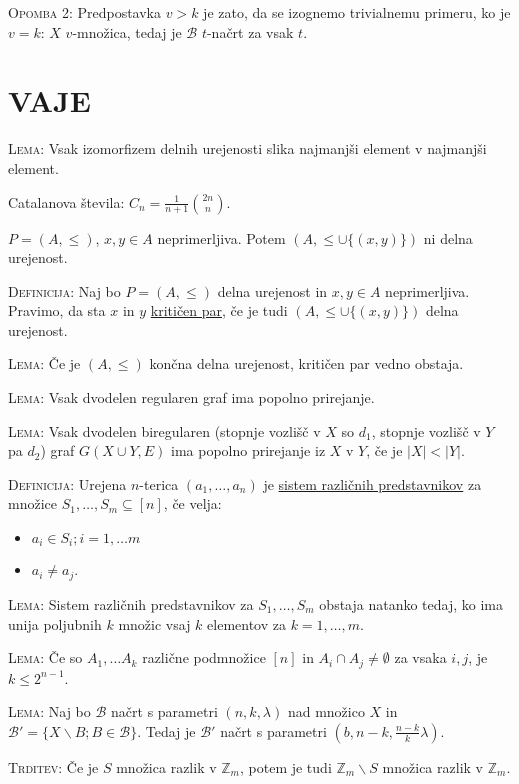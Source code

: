 \documentclass[8pt,a4paper]{amsart}
\theoremstyle{definition} %
\theoremstyle{plain} %
\newcommand{\Z}{\mathbb Z}
\begin{document}
\textsc{Opomba 2:} Predpostavka $v > k $ je zato, da se izognemo trivialnemu primeru, ko je $v = k$: $X$ $v$-množica, tedaj je $\mathcal{B}$ $t$-načrt za vsak $t$.

\section{VAJE}

\textsc{Lema:} Vsak izomorfizem delnih urejenosti slika najmanjši element v najmanjši element.

Catalanova števila: $C_n = \frac{1}{n+1}\binom{2n}{n}$.

$P=(A,\leq)$, $x,y \in A$ neprimerljiva. Potem $(A,\leq \cup \{ (x,y) \} )$ ni delna urejenost.

\textsc{Definicija:} Naj bo $P=(A,\leq)$ delna urejenost in $x,y \in A$ neprimerljiva. Pravimo, da sta $x$ in $y$ \underline{kritičen par}, če je tudi $(A,\leq \cup \{ (x,y)\} )$ delna urejenost.

\textsc{Lema:} Če je $(A, \leq )$ končna delna urejenost, kritičen par vedno obstaja.

\textsc{Lema:} Vsak dvodelen regularen graf ima popolno prirejanje.

\textsc{Lema:} Vsak dvodelen biregularen (stopnje vozlišč v $X$ so $d_1$, stopnje vozlišč v $Y$ pa $d_2$) graf $G(X \cup Y,E)$ ima popolno prirejanje iz $X$ v $Y$, če je $|X| < |Y|$.

\textsc{Definicija:} Urejena $n$-terica $(a_1,\ldots ,a_n)$ je \underline{sistem različnih predstavnikov} za množice $S_1,\ldots ,S_m \subseteq [n]$, če velja:
\begin{itemize}
\item $a_i \in S_i; i=1,\ldots m$
\item $a_i \neq a_j$.
\end{itemize}

\textsc{Lema:} Sistem različnih predstavnikov za $S_1,\ldots ,S_m$ obstaja natanko tedaj, ko ima unija poljubnih $k$ množic vsaj $k$ elementov za $k = 1,\ldots , m$.

\textsc{Lema:} Če so $A_1, \ldots A_k$ različne podmnožice $[n]$ in $A_i \cap A_j \neq \emptyset$ za vsaka $i,j$, je $k \leq 2^{n-1}$.

\textsc{Lema:} Naj bo $\mathcal{B}$ načrt s parametri $(n,k,\lambda)$ nad množico $X$ in $\mathcal{B}' = \{ X \backslash B ; B \in \mathcal{B} \}$. Tedaj je $\mathcal{B}'$ načrt s parametri $(b,n-k,\frac{n-k}{k}\lambda)$.

\textsc{Trditev:} Če je $S$ množica razlik v $\Z_m$, potem je tudi $\Z_m \backslash S$ množica razlik v $\Z_m$.
\end{document}
